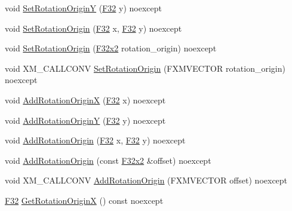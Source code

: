 \begin{DoxyCompactItemize}
\item 
void \mbox{\hyperlink{classmage_1_1_texture_transform2_d_a05927d67c0e26c7246d4006bae8debee}{Set\+Rotation\+OriginY}} (\mbox{\hyperlink{namespacemage_aa97e833b45f06d60a0a9c4fc22ae02c0}{F32}} y) noexcept
\item 
void \mbox{\hyperlink{classmage_1_1_texture_transform2_d_aefa487dadb8b10cc99c98760be349519}{Set\+Rotation\+Origin}} (\mbox{\hyperlink{namespacemage_aa97e833b45f06d60a0a9c4fc22ae02c0}{F32}} x, \mbox{\hyperlink{namespacemage_aa97e833b45f06d60a0a9c4fc22ae02c0}{F32}} y) noexcept
\item 
void \mbox{\hyperlink{classmage_1_1_texture_transform2_d_a5790e8501881755e6f8d7adc4058aa1b}{Set\+Rotation\+Origin}} (\mbox{\hyperlink{namespacemage_aee4759dedc8def6c6dec26b5c7eddf29}{F32x2}} rotation\+\_\+origin) noexcept
\item 
void X\+M\+\_\+\+C\+A\+L\+L\+C\+O\+NV \mbox{\hyperlink{classmage_1_1_texture_transform2_d_a79f382b3f0d12ff276655445dec1fe29}{Set\+Rotation\+Origin}} (F\+X\+M\+V\+E\+C\+T\+OR rotation\+\_\+origin) noexcept
\item 
void \mbox{\hyperlink{classmage_1_1_texture_transform2_d_abe5c859c43e15124fda9d038bb7111a3}{Add\+Rotation\+OriginX}} (\mbox{\hyperlink{namespacemage_aa97e833b45f06d60a0a9c4fc22ae02c0}{F32}} x) noexcept
\item 
void \mbox{\hyperlink{classmage_1_1_texture_transform2_d_af13de9a111c3c312281174883a3257d0}{Add\+Rotation\+OriginY}} (\mbox{\hyperlink{namespacemage_aa97e833b45f06d60a0a9c4fc22ae02c0}{F32}} y) noexcept
\item 
void \mbox{\hyperlink{classmage_1_1_texture_transform2_d_a179588f8dfaf2787d6d9817d1368de83}{Add\+Rotation\+Origin}} (\mbox{\hyperlink{namespacemage_aa97e833b45f06d60a0a9c4fc22ae02c0}{F32}} x, \mbox{\hyperlink{namespacemage_aa97e833b45f06d60a0a9c4fc22ae02c0}{F32}} y) noexcept
\item 
void \mbox{\hyperlink{classmage_1_1_texture_transform2_d_a3248ca15e8304740bda7249e5827c855}{Add\+Rotation\+Origin}} (const \mbox{\hyperlink{namespacemage_aee4759dedc8def6c6dec26b5c7eddf29}{F32x2}} \&offset) noexcept
\item 
void X\+M\+\_\+\+C\+A\+L\+L\+C\+O\+NV \mbox{\hyperlink{classmage_1_1_texture_transform2_d_abb0c58bde2e3e81f87cf693e339daab8}{Add\+Rotation\+Origin}} (F\+X\+M\+V\+E\+C\+T\+OR offset) noexcept
\item 
\mbox{\hyperlink{namespacemage_aa97e833b45f06d60a0a9c4fc22ae02c0}{F32}} \mbox{\hyperlink{classmage_1_1_texture_transform2_d_af6e95e897ef1d80bd7bb582feaeeba61}{Get\+Rotation\+OriginX}} () const noexcept

\end{DoxyCompactItemize}
